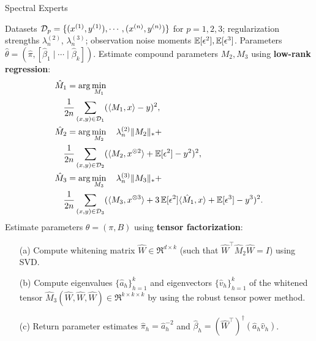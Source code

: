 \begin{algorithm}[t]
  \caption{Spectral Experts}
  \label{algo:spectral-experts}
  \begin{algorithmic}[1]
    \INPUT Datasets $\mathcal{D}_p = \{ (x^{(1)}, y^{(1)}), \cdots, (x^{(n)}, y^{(n)}) \}$ for $p = 1, 2, 3$;
    regularization strengths $\lambda_n^{(2)}$, $\lambda_n^{(3)}$;
    observation noise moments $\operatorname{\mathbb{E}}[\epsilon^2], \operatorname{\mathbb{E}}[\epsilon^3]$.
    \OUTPUT Parameters $\hat\theta = (\hat \pi, [\hat \beta_1 \mid \cdots \mid \hat \beta_k])$.
    \STATE Estimate compound parameters $M_2, M_3$ using \textbf{low-rank regression}:
    \begin{align}
      &\hat M_1 = \arg\min_{M_1} \label{eqn:estimateM1} \\
      &\quad\frac{1}{2n}\sum_{(x,y) \in \mathcal{D}_1} (\langle M_1, x \rangle - y)^2, \nonumber \\
      &\hat M_2 = \arg\min_{M_2} \quad \lambda_n^{(2)} \|M_2\|_* + \label{eqn:estimateM2} \\
      &\quad\frac{1}{2n}\sum_{(x,y) \in \mathcal{D}_2} (\langle M_2, x^{\otimes 2} \rangle + \operatorname{\mathbb{E}}[\epsilon^2] - y^2)^2, \nonumber \\
      &\hat M_3 = \arg\min_{M_3} \quad \lambda_n^{(3)} \|M_3\|_* + \label{eqn:estimateM3} \\
      &\quad\frac{1}{2n}\sum_{(x,y) \in \mathcal{D}_3} (\langle M_3, x^{\otimes 3} \rangle + 3 \operatorname{\mathbb{E}}[\epsilon^2]\langle \hat M_1, x \rangle + \operatorname{\mathbb{E}}[\epsilon^3] - y^3)^2. \nonumber
    \end{align}
    \STATE Estimate parameters $\theta = (\pi, B)$ using \textbf{tensor factorization}:
    \begin{enumerate}
      \item [(a)] Compute whitening matrix $\hat W \in \Re^{d \times k}$ (such that $\hat W^\top
      \hat M_2 \hat W = I$) using SVD.
      \item [(b)] Compute eigenvalues $\{\hat a_h\}_{h=1}^k$
      and eigenvectors $\{\hat v_h\}_{h=1}^k$
      of the whitened tensor $\hat M_3(\hat W, \hat W, \hat W) \in \Re^{k \times k \times k}$
      by using the robust tensor power method.
    \item [(c)] Return parameter estimates $\hat\pi_h = \hat a_h^{-2}$
    and $\hat\beta_h = (\hat W^{\top})^\dagger (\hat a_h \hat v_h)$.
    \end{enumerate}
  \end{algorithmic}
\end{algorithm}


